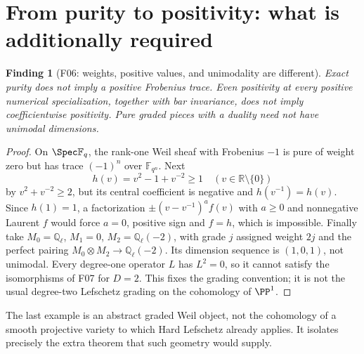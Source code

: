 \documentclass[11pt,a4paper]{article}
\newcommand{\Q}{\mathbb Q}\newcommand{\Z}{\mathbb Z}\newcommand{\C}{\mathbb C}\newcommand{\N}{\mathbb N}\newcommand{\F}{\mathbb F}
\newcommand{\fid}[1]{\textsf{#1}}\newcommand{\gate}[1]{\textsf{#1}}
\theoremstyle{named}\newtheorem{finding}{Finding}[section]
\theoremstyle{definition}\newtheorem{definition}[finding]{Definition}
\theoremstyle{remark}\newtheorem{remark}[finding]{Remark}
\begin{document}
\section{From purity to positivity: what is additionally required}\label{sec:positivity}
\begin{finding}[\fid{F06}: weights, positive values, and unimodality are different]\label{f:phase}
Exact purity does not imply a positive Frobenius trace. Even positivity at every positive numerical specialization, together with bar invariance, does not imply coefficientwise positivity. Pure graded pieces with a duality need not have unimodal dimensions.
\end{finding}
\begin{proof}
On $\Spec\F_q$, the rank-one Weil sheaf with Frobenius $-1$ is pure of weight zero but has trace $(-1)^n$ over $\F_{q^n}$. Next
\[
 h(v)=v^2-1+v^{-2}\ge1\quad(v\in\mathbb R\setminus\{0\})
\]
by $v^2+v^{-2}\ge2$, but its central coefficient is negative and $h(v^{-1})=h(v)$. Since $h(1)=1$, a factorization $\pm(v-v^{-1})^a f(v)$ with $a\ge0$ and nonnegative Laurent $f$ would force $a=0$, positive sign and $f=h$, which is impossible. Finally take $M_0=\Q_\ell$, $M_1=0$, $M_2=\Q_\ell(-2)$, with grade $j$ assigned weight $2j$ and the perfect pairing $M_0\otimes M_2\to\Q_\ell(-2)$. Its dimension sequence is $(1,0,1)$, not unimodal. Every degree-one operator $L$ has $L^2=0$, so it cannot satisfy the isomorphisms of \fid{F07} for $D=2$. This fixes the grading convention; it is not the usual degree-two Lefschetz grading on the cohomology of $\PP^1$.
\end{proof}
The last example is an abstract graded Weil object, not the cohomology of a smooth projective variety to which Hard Lefschetz already applies. It isolates precisely the extra theorem that such geometry would supply.
\end{document}
